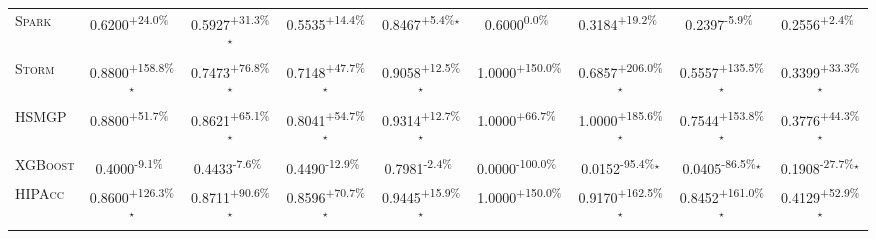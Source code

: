 \begin{table}[htbp]
\begin{tabular}{l|cccc|cccc}
\textsc{Spark} & \cellcolor{green!30}0.6200\textsuperscript{+24.0\%}$^{\,\,\,}$ & \cellcolor{green!30}0.5927\textsuperscript{+31.3\%}$^\star$ & \cellcolor{green!30}0.5535\textsuperscript{+14.4\%}$^{\,\,\,}$ & \cellcolor{green!30}0.8467\textsuperscript{+5.4\%}$^\star$ & \cellcolor{red!30}0.6000\textsuperscript{0.0\%}$^{\,\,\,}$ & \cellcolor{green!30}0.3184\textsuperscript{+19.2\%}$^{\,\,\,}$ & \cellcolor{red!30}0.2397\textsuperscript{-5.9\%}$^{\,\,\,}$ & \cellcolor{green!30}0.2556\textsuperscript{+2.4\%}$^{\,\,\,}$ \\
\textsc{Storm} & \cellcolor{green!30}0.8800\textsuperscript{+158.8\%}$^\star$ & \cellcolor{green!30}0.7473\textsuperscript{+76.8\%}$^\star$ & \cellcolor{green!30}0.7148\textsuperscript{+47.7\%}$^\star$ & \cellcolor{green!30}0.9058\textsuperscript{+12.5\%}$^\star$ & \cellcolor{green!30}1.0000\textsuperscript{+150.0\%}$^{\,\,\,}$ & \cellcolor{green!30}0.6857\textsuperscript{+206.0\%}$^\star$ & \cellcolor{green!30}0.5557\textsuperscript{+135.5\%}$^\star$ & \cellcolor{green!30}0.3399\textsuperscript{+33.3\%}$^\star$ \\
\textsc{HSMGP} & \cellcolor{green!30}0.8800\textsuperscript{+51.7\%}$^{\,\,\,}$ & \cellcolor{green!30}0.8621\textsuperscript{+65.1\%}$^\star$ & \cellcolor{green!30}0.8041\textsuperscript{+54.7\%}$^\star$ & \cellcolor{green!30}0.9314\textsuperscript{+12.7\%}$^\star$ & \cellcolor{green!30}1.0000\textsuperscript{+66.7\%}$^{\,\,\,}$ & \cellcolor{green!30}1.0000\textsuperscript{+185.6\%}$^\star$ & \cellcolor{green!30}0.7544\textsuperscript{+153.8\%}$^\star$ & \cellcolor{green!30}0.3776\textsuperscript{+44.3\%}$^\star$ \\
\textsc{XGBoost} & \cellcolor{red!30}0.4000\textsuperscript{-9.1\%}$^{\,\,\,}$ & \cellcolor{red!30}0.4433\textsuperscript{-7.6\%}$^{\,\,\,}$ & \cellcolor{red!30}0.4490\textsuperscript{-12.9\%}$^{\,\,\,}$ & \cellcolor{red!30}0.7981\textsuperscript{-2.4\%}$^{\,\,\,}$ & \cellcolor{red!30}0.0000\textsuperscript{-100.0\%}$^{\,\,\,}$ & \cellcolor{red!30}0.0152\textsuperscript{-95.4\%}$^\star$ & \cellcolor{red!30}0.0405\textsuperscript{-86.5\%}$^\star$ & \cellcolor{red!30}0.1908\textsuperscript{-27.7\%}$^\star$ \\
\textsc{HIPAcc} & \cellcolor{green!30}0.8600\textsuperscript{+126.3\%}$^\star$ & \cellcolor{green!30}0.8711\textsuperscript{+90.6\%}$^\star$ & \cellcolor{green!30}0.8596\textsuperscript{+70.7\%}$^\star$ & \cellcolor{green!30}0.9445\textsuperscript{+15.9\%}$^\star$ & \cellcolor{green!30}1.0000\textsuperscript{+150.0\%}$^{\,\,\,}$ & \cellcolor{green!30}0.9170\textsuperscript{+162.5\%}$^\star$ & \cellcolor{green!30}0.8452\textsuperscript{+161.0\%}$^\star$ & \cellcolor{green!30}0.4129\textsuperscript{+52.9\%}$^\star$ \\

\end{tabular}
\end{table}

